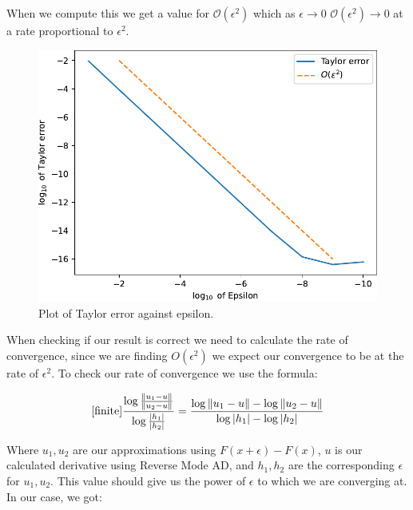 \documentclass{article}
\begin{document}
When we compute this we get a value for $\mathcal{O}(\epsilon^2)$ which as $\epsilon \longrightarrow 0$ $\mathcal{O}(\epsilon^2) \to 0$ at a rate proportional to $\epsilon^2$.

\begin{figure}[h!]
    \includegraphics[width=12cm]{images/taylor_error_1.pdf}
    \caption{Plot of Taylor error against epsilon.}
    \label{fig:taylorerror}
\end{figure}

When checking if our result is correct we need to calculate the rate of convergence, since we are finding $O(\epsilon^2)$ we expect our convergence to be at the rate of $\epsilon^2$. To check our rate of convergence we use the formula:

\begin{equation}
    \cite{finite} \frac{\log{\frac{\|u_1 - u\|}{\|u_2 - u\|}}}{\log{\frac{|h_1|}{|h_2|}}} = \frac{\log\|u_1 - u\| - \log\|u_2 - u\|}{\log|h_1| - \log|h_2|}
\end{equation}

Where $u_1, u_2$ are our approximations using $F(x + \epsilon) - F(x)$, $u$ is our calculated derivative using Reverse Mode AD, and $h_1, h_2$ are the corresponding $\epsilon$ for $u_1, u_2$. This value should give us the power of $\epsilon$ to which we are converging at. In our case, we got:

\begin{center}
\end{center}
\end{document}
